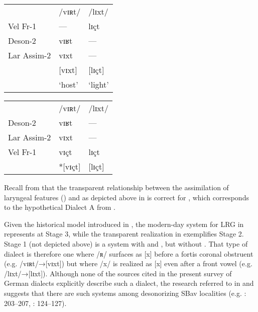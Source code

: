 \ea%
    \label{ex:5:28}
    \begin{multicols}{2}\raggedcolumns
\ea\label{ex:5:28a}
\begin{tabular}[t]{@{}lll@{}}
             & /vɪʀt/&   /lɪxt/\\
Vel Fr-1    &  ---   & lɪçt   \\
Deson-2     &  vɪʁt  & ---    \\
Lar Assim-2 &   vɪxt & ---    \\
            & [vɪxt] & [lɪçt] \\
            & ‘host’ & ‘light’\\
\end{tabular}\columnbreak
\ex\label{ex:5:28b}\begin{tabular}[t]{@{}lll@{}} 
     & /vɪʀt/&  /lɪxt/\\
Deson-2     &  vɪʁt &  --- \\
Lar Assim-2 &  vɪxt &  --- \\
Vel Fr-1    &  vɪçt &  lɪçt\\
            & *[vɪçt] & [lɪçt]\\
\end{tabular}
\z \end{multicols}
\z 

Recall from  that the transparent relationship between the assimilation of laryngeal features () and  as depicted above in  is correct for , which corresponds to the hypothetical Dialect A from .

Given the historical model introduced in , the modern-day system for LRG in  represents  at Stage 3, while the transparent realization in  exemplifies Stage 2. Stage 1 (not depicted above) is a system with  and , but without . That type of dialect is therefore one where /ʀ/ surfaces as [x] before a fortis coronal obstruent (e.g. /vɪʀt/→[vɪxt]) but where /x/ is realized as [x] even after a front vowel (e.g. /lɪxt/→[lɪxt]). Although none of the sources cited in the present survey of German dialects explicitly describe such a dialect, the research referred to in  and  suggests that there are such systems among desonorizing SBav localities (e.g. \citealt{Roitinger1954}: 203--207, \citealt{Kranzmayer1956}: 124--127).

